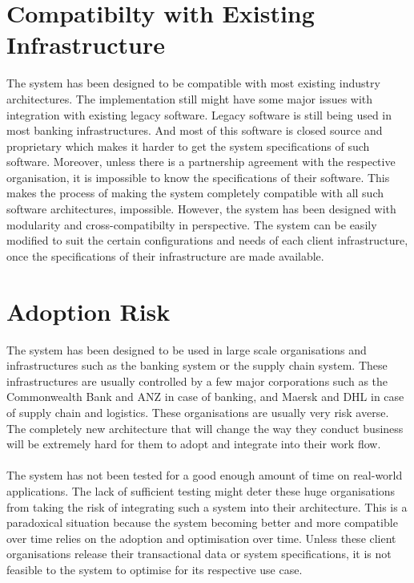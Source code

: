 \documentclass[a4paper,twoside,phd]{BYUPhys}
\begin{document}
\section{Compatibilty with Existing Infrastructure}
The system has been designed to be compatible with most existing industry architectures. The implementation still might have some major issues with integration with existing legacy software. Legacy software is still being used in most banking infrastructures. And most of this software is closed source and proprietary which makes it harder to get the system specifications of such software. Moreover, unless there is a partnership agreement with the respective organisation, it is impossible to know the specifications of their software. This makes the process of making the system completely compatible with all such software architectures, impossible. However, the system has been designed with modularity and cross-compatibilty in perspective. The system can be easily modified to suit the certain configurations and needs of each client infrastructure, once the specifications of their infrastructure are made available.
\section{Adoption Risk}
The system has been designed to be used in large scale organisations and infrastructures such as the banking system or the supply chain system. These infrastructures are usually controlled by a few major corporations such as the Commonwealth Bank and ANZ in case of banking, and Maersk and DHL in case of supply chain and logistics. These organisations are usually very risk averse. The completely new architecture that will change the way they conduct business will be extremely hard for them to adopt and integrate into their work flow.
\\
\\
The system has not been tested for a good enough amount of time on real-world applications. The lack of sufficient testing might deter these huge organisations from taking the risk of integrating such a system into their architecture. This is a paradoxical situation because the system becoming better and more compatible over time relies on the adoption and optimisation over time. Unless these client organisations release their transactional data or system specifications, it is not feasible to the system to optimise for its respective use case.
\end{document}
